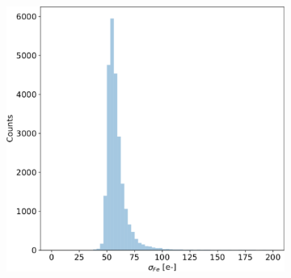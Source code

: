         \begin{figure}
            \centering
            \begin{subfigure}[b]{0.49\textwidth}
                \centering
                \includegraphics[width=\linewidth]{figures/charaterization/sigma_fe55.pdf} 
                \caption{}
                \label{fig:Fe55_width_hist}
            \end{subfigure}
            \hfill
            \begin{subfigure}[b]{0.49\textwidth}
                \centering

\end{subfigure}
\end{figure}
